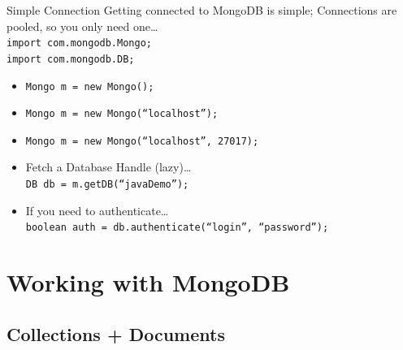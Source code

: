 \documentclass{beamer}
\begin{document}
\begin{frame}{Simple Connection}
    Getting connected to MongoDB is simple; 
    Connections are pooled, so you only need one\dots\\
    \texttt{\scriptsize import com.mongodb.Mongo;\\ import com.mongodb.DB; }
    \pause
    \begin{itemize}
        \item{\texttt{\scriptsize Mongo m = new Mongo();}}
        \item{\texttt{\scriptsize Mongo m = new Mongo(``localhost'');}}
        \item{\texttt{\scriptsize Mongo m = new Mongo(``localhost'', 27017);}}
        \item{Fetch a Database Handle (lazy)\dots\\
            \texttt{\scriptsize DB db = m.getDB(``javaDemo'');}} 
        \item{If you need to authenticate\dots\\
        \texttt{\scriptsize boolean auth = db.authenticate(``login'', ``password'');}
        }
    \end{itemize}

\end{frame}

\section{Working with MongoDB}

\subsection[Collections + Documents]{Collections + Documents}
\end{document}

